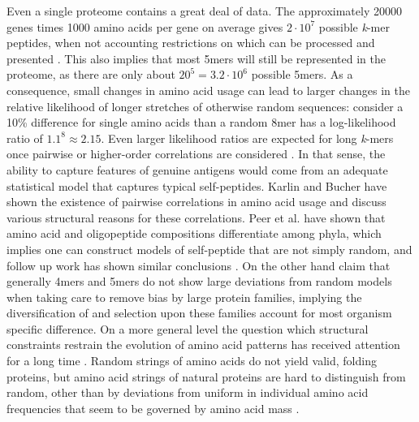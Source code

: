 \documentclass[superscriptaddress,twocolumn,pre]{revtex4}
\newcommand{\<}{\langle}
\renewcommand{\>}{\rangle}
\begin{document}
Even a single proteome contains a great deal of data. The approximately 20000 genes times 1000 amino acids per gene on average gives $2 \cdot 10^7$ possible {\it k}-mer peptides, when not accounting restrictions on which can be processed and presented \cite{Luksza}. This also implies that most 5mers will still be represented in the proteome, as there are only about $20^5 = 3.2 \cdot 10^6$ possible 5mers. As a consequence, small changes in amino acid usage can lead to larger changes in the relative likelihood of longer stretches of otherwise random sequences: consider a 10\% difference for single amino acids than a random 8mer has a log-likelihood ratio of $1.1^8 \approx 2.15$. Even larger likelihood ratios are expected for long {\it k}-mers once pairwise or higher-order correlations are considered  \cite{Schneidman2006}. In that sense, the ability to capture features of genuine antigens would come from an adequate statistical model that captures typical self-peptides. Karlin and Bucher \cite{Karlin1992} have shown the existence of pairwise correlations in amino acid usage and discuss various structural reasons for these correlations. Peer et al. \cite{Peer2004} have shown that amino acid and oligopeptide compositions differentiate among phyla, which implies one can construct models of self-peptide that are not simply random, and follow up work has shown similar conclusions \cite{Bogatyreva2006}. On the other hand \cite{Lavelle2009} claim that generally 4mers and 5mers do not show large deviations from random models when taking care to remove bias by large protein families, implying the diversification of and selection upon these families account for most organism specific difference. On a more general level the question which structural constraints restrain the evolution of amino acid patterns has received attention for a long time \cite{Turjanski2018}. Random strings of amino acids do not yield valid, folding proteins, but amino acid strings of natural proteins are hard to distinguish from random, other than by deviations from uniform in individual amino acid frequencies that seem to be governed by amino acid mass \cite{BenAlbert}.
\end{document}
